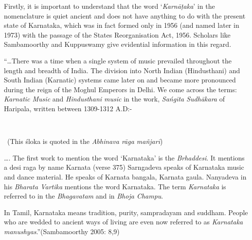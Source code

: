 Firstly, it is important to understand that the word ‘\textit{Karnāṭaka}’ in the nomenclature is quiet ancient and does not have anything to do with the present state of Karnataka, which was in fact formed only in 1956 (and named later in 1973) with the passage of the States Reorganisation Act, 1956. Scholars like Sambamoorthy and Kuppuswamy give evidential information in this regard.

\newpage

\begin{myquote}
“…There was a time when a single system of music prevailed throughout the length and breadth of India. The division into North Indian (Hindusthani) and South Indian (Karnatic) systems came later on and became more pronounced during the reign of the Moghul Emperors in Delhi. We come across the terms: \textit{Karnatic Music} and \textit{Hindusthani music} in the work, \textit{Sańgīta Sudhākara} of Haripala, written between 1309-1312 A.D:-
\end{myquote}

\begin{myquote}
\\

~\hfill (This śloka is quoted in the \textit{Abhinava rāga mañjarī})
\end{myquote}

\begin{myquote}
…. The first work to mention the word ‘Karnataka’ is the \textit{Brhaddesi}. It mentions a desi raga by name Karnata (verse 375) Sarngadeva speaks of Karnataka music and dance material. He speaks of Karnata bangala, Karnata gaula. Nanyadeva in his \textit{Bharata Vartika} mentions the word Karnataka. The term \textit{Karnataka} is referred to in the \textit{Bhagavatam} and in \textit{Bhoja Champu}.
\end{myquote}

\begin{myquote}
In Tamil, Karnataka means tradition, purity, sampradayam and suddham. People who are wedded to ancient ways of living are even now referred to as \textit{Karnataka manushyas}.”\hfill (Sambamoorthy 2005: 8,9)
\end{myquote}

